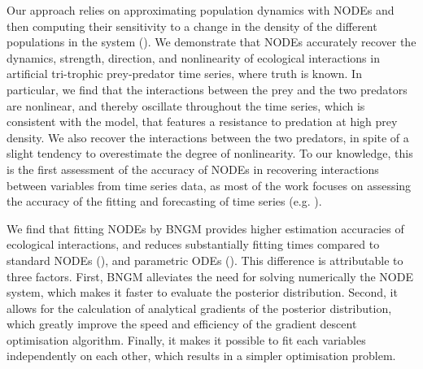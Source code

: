 \documentclass[11pt, oneside]{article}
\begin{document}
Our approach relies on approximating population dynamics with NODEs and then computing their sensitivity to a change in the density of the different populations in the system (\cite{Bonnaffe2021a}). 
We demonstrate that NODEs accurately recover the dynamics, strength, direction, and nonlinearity of ecological interactions in artificial tri-trophic prey-predator time series, where truth is known.
In particular, we find that the interactions between the prey and the two predators are nonlinear, and thereby oscillate throughout the time series, which is consistent with the model, that features a resistance to predation at high prey density.
We also recover the interactions between the two predators, in spite of a slight tendency to overestimate the degree of nonlinearity.
To our knowledge, this is the first assessment of the accuracy of NODEs in recovering interactions between variables from time series data, as most of the work focuses on assessing the accuracy of the fitting and forecasting of time series (e.g. \cite{Mai2016,Chen2018,Treven2021,Frank2022}).

We find that fitting NODEs by BNGM provides higher estimation accuracies of ecological interactions, and reduces substantially fitting times compared to standard NODEs (\cite{Bonnaffe2021a}), and parametric ODEs (\cite{Rosenbaum2019}).
This difference is attributable to three factors.
First, BNGM alleviates the need for solving numerically the NODE system, which makes it faster to evaluate the posterior distribution.
Second, it allows for the calculation of analytical gradients of the posterior distribution, which greatly improve the speed and efficiency of the gradient descent optimisation algorithm.
Finally, it makes it possible to fit each variables independently on each other, which results in a simpler optimisation problem.
\end{document}
